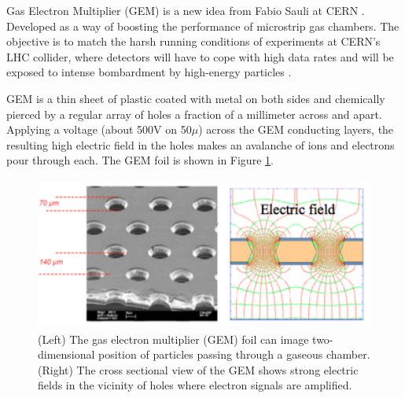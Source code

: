 Gas Electron Multiplier (GEM) is a new idea from Fabio Sauli at CERN \cite{Sauli1997}. Developed as a way of boosting the performance of microstrip gas chambers. The objective is to match the harsh running conditions of experiments at CERN's LHC collider, where detectors will have to cope with high data rates and will be exposed to intense bombardment by high-energy particles \cite{detector:1732870}.

GEM is a thin sheet of plastic coated with metal on both sides and chemically pierced by a regular array of holes a fraction of a millimeter across and apart. Applying a voltage (about 500V on 50$\mu$) across the GEM conducting layers, the resulting high electric field in the holes makes an avalanche of ions and electrons pour through each. The GEM foil is shown in Figure \ref{gem}.
\begin{figure}[htb]
	\begin{center}
		\includegraphics[width=12.0cm,height=5cm]{figures/GEM/KEKDTP3.jpg}
		\caption{(Left) The gas electron multiplier (GEM) foil can image two-dimensional position of particles passing through a gaseous chamber. (Right) The cross sectional view of the GEM shows strong electric fields in the vicinity of holes where electron signals are amplified.}
		\label{gem}
	\end{center}
\end{figure} 

